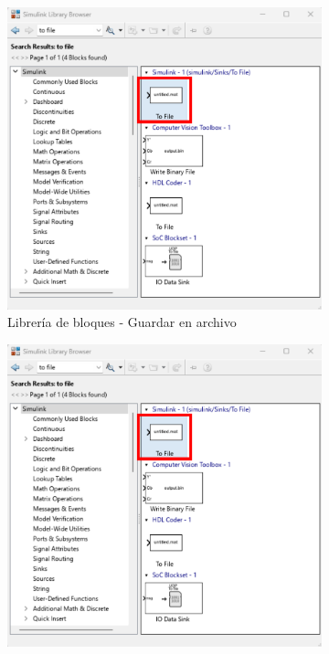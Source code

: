 \begin{figure}[htbp]
    \centering
    \begin{subfigure}[b]{0.35\textwidth}
        \centering
        \includegraphics[width=\textwidth]{fig/Capitulo5/Caso_de_estudio_IMU/Generador_de_archivos/libreria_de_bloques_to_file.pdf}
        \caption{Librería de bloques - Guardar en archivo}
        \label{fig:lib_bloques_to_file_IMU}
    \end{subfigure}
    \hfill
    \begin{subfigure}[b]{0.45\textwidth}
        \centering
        \includegraphics[width=\textwidth]{fig/Capitulo5/Caso_de_estudio_IMU/Generador_de_archivos/libreria_de_bloques_to_file.pdf}

\end{subfigure}
\end{figure}
